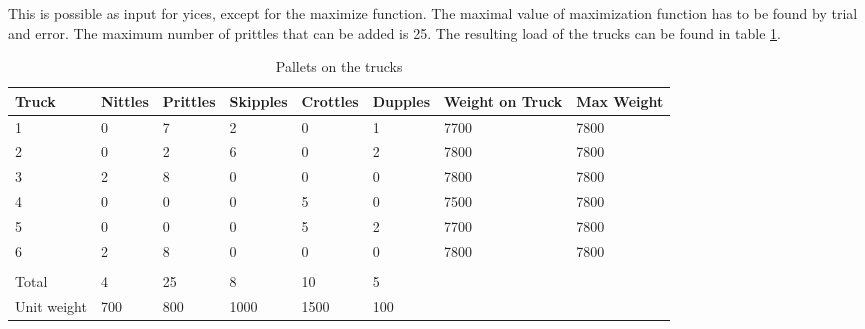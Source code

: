 This is possible as input for yices, except for the maximize function. The maximal value of maximization function has to be found by trial and error. The maximum number of prittles that can be added is 25.
The resulting load of the trucks can be found in table \ref{table:assignment1}.
\begin{table}[]
	\centering
	\caption{Pallets on the trucks}
	\label{table:assignment1}
	\begin{tabular}{@{}llllllll@{}}
		\toprule
		Truck  & Nittles & Prittles & Skipples & Crottles & Dupples & Weight on Truck & Max Weight \\ \midrule
		1      & 0       & 7        & 2        & 0        & 1       & 7700            & 7800       \\
		2      & 0       & 2        & 6        & 0        & 2       & 7800            & 7800       \\
		3      & 2       & 8        & 0        & 0        & 0       & 7800            & 7800       \\
		4      & 0       & 0        & 0        & 5        & 0       & 7500            & 7800       \\
		5      & 0       & 0        & 0        & 5        & 2       & 7700            & 7800       \\
		6      & 2       & 8        & 0        & 0        & 0       & 7800            & 7800       \\
		&         &          &          &          &         &                 &            \\
		\toprule
		Total  & 4       & 25       & 8        & 10       & 5       &                 &            \\
		Unit weight & 700     & 800      & 1000     & 1500     & 100     &                 &            \\ \bottomrule
	\end{tabular}
\end{table}